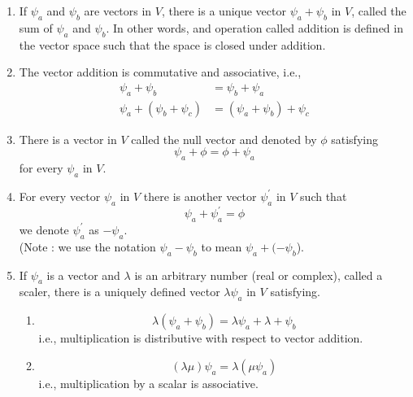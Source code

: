 \begin{enumerate}
	\item 
	If $\psi_a$ and $\psi_b$ are vectors in $V$, there is a unique vector $\psi_a + \psi_b$ in $V$, called the sum of $\psi_a $ and $\psi_b$. In other words, and operation called addition is defined in the vector space such that the space is closed under addition.
	
	\item 
	The vector addition is commutative and associative, i.e.,
	\begin{eqnarray}\label{eqn:2.1-2.2}
		\psi_a + \psi_b &= \psi_b + \psi_a \\
		\psi_a + (\psi_b + \psi_c) &= (\psi_a + \psi_b) + \psi_c
	\end{eqnarray}
	
	\item 
	There is a vector in $V$ called the null vector and denoted by $\phi$ satisfying
	\begin{equation}\label{eqn:2.3}
	\psi_a + \phi = \phi + \psi_a
	\end{equation}
	for every $\psi_a$ in $V$.
	
	\item 
	For every vector $\psi_a$ in $V$ there is another vector $\psi_a^\prime$ in $V$ such that
	\begin{equation}\label{eqn:2.4}
	\psi_a + \psi_a^\prime = \phi
	\end{equation}
	we denote $\psi_a^\prime$ as $-\psi_a$.\\
	(Note : we use the notation $\psi_a - \psi_b$ to mean $\psi_a + (-\psi_b$).
	
	\item 
	If $\psi_a$ is a vector and $\lambda$ is an arbitrary number (real or complex), called a scaler, there is a uniquely defined vector $\lambda \psi_a$ in $V$ satisfying.
	\begin{enumerate}
		\item 
		\begin{equation}\label{eqn:2.5}
		\lambda (\psi_a  + \psi_b) = \lambda \psi_a + \lambda + \psi_b
		\end{equation}
		i.e., multiplication is distributive with respect to vector addition.
		
		\item 
		\begin{equation}\label{eqn:2.6}
		(\lambda \mu) \psi_a = \lambda (\mu \psi_a)
		\end{equation}
		i.e., multiplication  by a scalar is associative.
		

\end{enumerate}
\end{enumerate}
